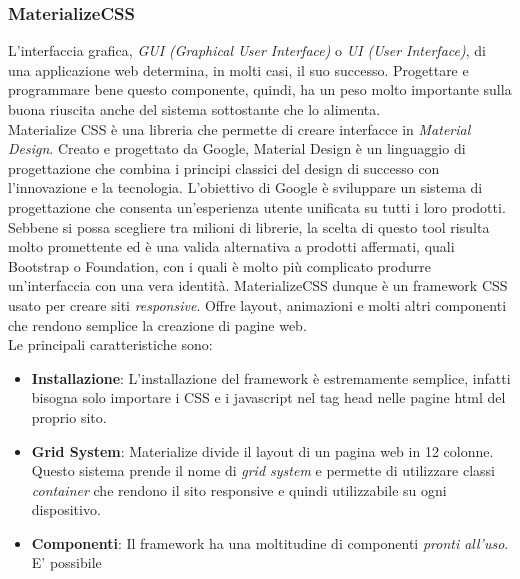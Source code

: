 \subsubsection{MaterializeCSS}
\label{sec:materialCSS}
L'interfaccia grafica, \textit{GUI (Graphical User Interface)} o \textit{UI (User Interface)}, di una applicazione web determina, in molti casi, il suo successo. Progettare e programmare bene questo componente, quindi, ha un peso molto importante sulla buona riuscita anche del sistema sottostante che lo alimenta. 
\\Materialize CSS è una libreria che permette di creare interfacce in \textit{Material Design}. Creato e progettato da Google, Material Design è un linguaggio di progettazione che combina i principi classici del design di successo con l'innovazione e la tecnologia. L'obiettivo di Google è sviluppare un sistema di progettazione che consenta un'esperienza utente unificata su tutti i loro prodotti. Sebbene si possa scegliere tra milioni di librerie, la scelta di questo tool risulta molto promettente ed è una valida alternativa a prodotti affermati, quali Bootstrap o Foundation, con i quali è molto più complicato produrre un'interfaccia con una vera identità. MaterializeCSS dunque è un framework CSS usato per creare siti \textit{responsive}. Offre layout, animazioni e molti altri componenti che rendono semplice la creazione di pagine web.
\\Le principali caratteristiche sono:
\begin{itemize}
\item \textbf{Installazione}: L'installazione del framework è estremamente semplice, infatti bisogna solo importare i CSS e i javascript nel tag head nelle pagine html del proprio sito.
\item \textbf{Grid System}: Materialize divide il layout di un pagina web in 12 colonne. Questo sistema prende il nome di \textit{grid system} e permette di utilizzare classi \textit{container} che rendono il sito responsive e quindi utilizzabile su ogni dispositivo.
\item \textbf{Componenti}: Il framework ha una moltitudine di componenti \textit{pronti all'uso}. E' possibile   
\end{itemize} 

